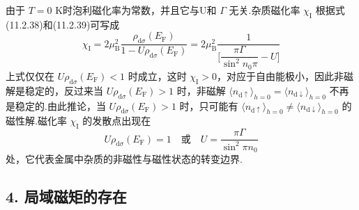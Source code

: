 由于 $T=0$ K时泡利磁化率为常数，并且它与U和 $\Gamma$ 无关.杂质磁化率 $\chi_{\mathrm{I}}$ 根据式(11.2.38)和(11.2.39)可写成
\begin{equation}
  \chi_{\mathrm{I}}=2\mu^{2}_{\mathrm{B}}
  \frac{\rho_{\mathrm{d}\sigma}(E_{\mathrm{F}})}
  {1-U\rho_{\mathrm{d}\sigma}(E_{\mathrm{F}})}
  =2\mu^{2}_{\mathrm{B}}
  \frac{1}{\biggl[\dfrac{\pi\Gamma}{\sin^{2}n_{0}\pi}-U\biggr]}
\end{equation}
上式仅仅在 $U\rho_{\mathrm{d}\sigma}(E_{\mathrm{F}})<1$ 时成立，这时 $\chi_{\mathrm{I}}>0$，对应于自由能极小，因此非磁解是稳定的，反过来当 $U\rho_{\mathrm{d}\sigma}(E_{\mathrm{F}})>1$ 时，非磁解
$\langle n_{\mathrm{d}\uparrow}\rangle_{h=0}
=\langle n_{\mathrm{d}\downarrow}\rangle_{h=0}$
不再是稳定的.由此推论，当 $U\rho_{\mathrm{d}\sigma}(E_{\mathrm{F}})>1$ 时，只可能有
$\langle n_{\mathrm{d}\uparrow}\rangle_{h=0}
\neq\langle n_{\mathrm{d}\downarrow}\rangle_{h=0}$
的磁性解.磁化率 $\chi_{\mathrm{I}}$ 的发散点出现在
\begin{equation}
  U\rho_{\mathrm{d}\sigma}(E_{\mathrm{F}})=1
  \quad\text{或}\quad
  U=\frac{\pi\Gamma}{\sin^{2}\pi n_{0}}
\end{equation}
处，它代表金属中杂质的非磁性与磁性状态的转变边界.

\subsection*{4. 局域磁矩的存在}

